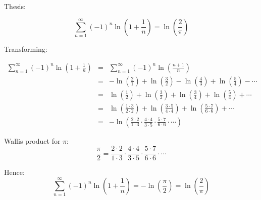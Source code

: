 \documentclass[12pt]{article}
\begin{document}
Thesis:

$$ \sum_{n=1}^{\infty} (-1)^n \ln \left(1 + \frac{1}{n} \right) = \ln \left( \frac{2}{\pi} \right) $$

Transforming:

\begin{eqnarray*}
\sum_{n=1}^{\infty} (-1)^n \ln \left(1 + \frac{1}{n} \right) &=& \displaystyle\sum_{n=1}^{\infty} (-1)^n \ln \left(\frac{n+1}{n} \right) \\
	&=& -\ln \left( \frac{2}{1}  \right) + \ln \left( \frac{3}{2}  \right) - \ln \left( \frac{4}{3}  \right) + \ln \left( \frac{5}{4}  \right) - \cdots \\
	&=& \ln \left( \frac{1}{2}  \right) + \ln \left( \frac{3}{2}  \right) + \ln \left( \frac{3}{4}  \right) + \ln \left( \frac{5}{4}  \right) + \cdots \\
	&=& \ln \left( \frac{1 \cdot 3}{2 \cdot 2}  \right) + \ln \left( \frac{3 \cdot 5}{4 \cdot 4}  \right) + \ln \left( \frac{5\cdot 7}{6\cdot 6}  \right) + \cdots \\
	&=& - \ln \left( \frac{2 \cdot 2}{1 \cdot 3} \cdot \frac{4 \cdot 4}{3 \cdot 5} \cdot \frac{5 \cdot 7}{6 \cdot 6} \cdot \cdots \right)
\end{eqnarray*}

Wallis product for $\pi$: 
$$ \frac{\pi}{2} = \frac{2 \cdot 2}{1 \cdot 3} \cdot \frac{4 \cdot 4}{3 \cdot 5} \cdot \frac{5 \cdot 7}{6 \cdot 6} \cdot \cdots $$

Hence:
$$ 
\sum_{n=1}^{\infty} (-1)^n \ln \left(1 + \frac{1}{n} \right) = - \ln \left( \frac{\pi}{2} \right) = \ln \left( \frac{2}{\pi} \right)
$$
\end{document}
